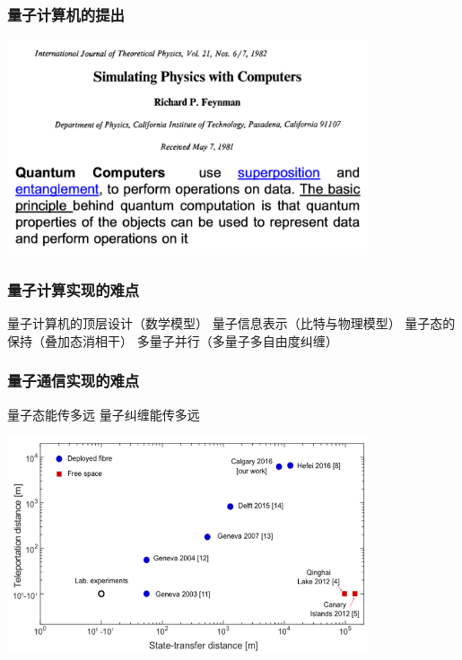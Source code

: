 \begin{frame} 
    \frametitle{量子计算机的提出}
    \begin{center}
        \includegraphics[width=0.8\textwidth]{figs/4.png}
    \end{center} 
\end{frame}

\begin{frame} 
    \frametitle{量子计算实现的难点}
    \begin{enumerate}
        \Item   量子计算机的顶层设计（数学模型）
        \Item   量子信息表示（比特与物理模型）
        \Item   量子态的保持（叠加态消相干）
        \Item   多量子并行（多量子多自由度纠缠）
    \end{enumerate}
\end{frame}

\begin{frame} 
    \frametitle{量子通信实现的难点}
    \begin{enumerate}
        \Item   量子态能传多远
        \Item   量子纠缠能传多远
    \end{enumerate}
    \begin{center}
        \includegraphics[width=0.8\textwidth]{figs/5.png}
    \end{center} 
\end{frame}

